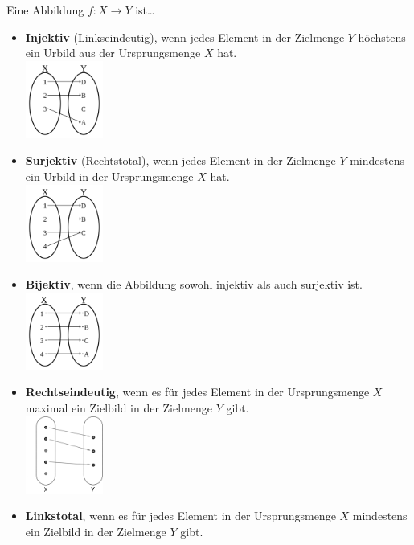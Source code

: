 \documentclass[12pt]{article}
\begin{document}
\begin{flushleft}
    Eine Abbildung $f: X \rightarrow Y$ ist\dots
    \begin{itemize}
        \item \textbf{Injektiv} (Linkseindeutig), wenn jedes Element in der Zielmenge $Y$ höchstens ein Urbild aus der Ursprungsmenge $X$ hat. \\
        \includegraphics[width=0.2\textwidth]{injektiv.png} \pagebreak
        \item \textbf{Surjektiv} (Rechtstotal), wenn jedes Element in der Zielmenge $Y$ mindestens ein Urbild in der Ursprungsmenge $X$ hat. \\
        \includegraphics[width=0.2\textwidth]{surjektiv.png}
        \item \textbf{Bijektiv}, wenn die Abbildung sowohl injektiv als auch surjektiv ist. \\
        \includegraphics[width=0.2\textwidth]{bijektiv.png}
        \item \textbf{Rechtseindeutig}, wenn es für jedes Element in der Ursprungsmenge $X$ maximal ein Zielbild in der Zielmenge $Y$ gibt. \\
        \includegraphics[width=0.2\textwidth]{rechtseindeutig.png}
        \item \textbf{Linkstotal}, wenn es für jedes Element in der Ursprungsmenge $X$ mindestens ein Zielbild in der Zielmenge $Y$ gibt. \\

\end{itemize}
\end{flushleft}
\end{document}
